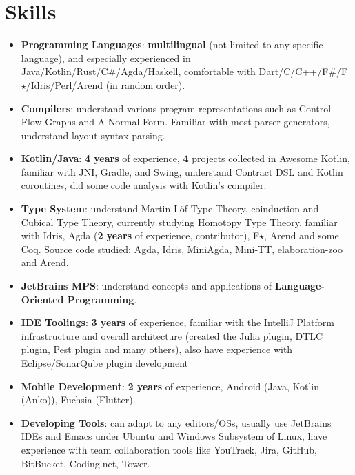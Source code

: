 \documentclass{resume}
\begin{document}
\section{Skills}
\begin{itemize}
  \item \textbf{Programming Languages}:
    \textbf{multilingual} (not limited to any specific language),
    and especially experienced in Java/Kotlin/Rust/C\#/Agda/Haskell,
    comfortable with Dart/C/C++/F\#/F$\star$/Idris/Perl/Arend (in random order).

  \item \textbf{Compilers}:
    understand various program representations such as Control Flow Graphs
    and A-Normal Form.
    Familiar with most parser generators, understand layout syntax parsing.

  \item \textbf{Kotlin/Java}:
    \textbf{4 years} of experience,
    \textbf{4} projects collected in
    \href{https://kotlin.link/?q=ice} {Awesome Kotlin},
    familiar with JNI, Gradle, and Swing,
    understand Contract DSL and Kotlin coroutines,
    did some code analysis with Kotlin's compiler.

  \item \textbf{Type System}:
    understand Martin-L\"{o}f Type Theory, coinduction and Cubical Type Theory,
    currently studying Homotopy Type Theory,
    familiar with Idris, Agda (\textbf{2 years} of experience, contributor),
    F$\star$, Arend and some Coq.
    \subitem Source code studied: Agda, Idris, MiniAgda, Mini-TT, elaboration-zoo and Arend.

  \item \textbf{JetBrains MPS}:
    understand concepts and applications of \textbf{Language-Oriented Programming}.

  \item \textbf{IDE Toolings}:
    \textbf{3 years} of experience,
    familiar with the IntelliJ Platform infrastructure and overall
    architecture (created the
    \href{https://plugins.jetbrains.com/plugin/10413}
         {Julia plugin},
    \href{https://plugins.jetbrains.com/plugin/12176}
         {DTLC plugin},
    \href{https://plugins.jetbrains.com/plugin/12046}
         {Pest plugin} and many others), also have experience with Eclipse/SonarQube
    plugin development

  \item \textbf{Mobile Development}:
    \textbf{2 years} of experience,
    Android (Java, Kotlin (Anko)), Fuchsia (Flutter).

  \item \textbf{Developing Tools}:
    can adapt to any editors/OSs, usually use JetBrains IDEs and Emacs under Ubuntu
    and Windows Subsystem of Linux,
    have experience with team collaboration tools like YouTrack,
    Jira, GitHub, BitBucket, Coding.net, Tower.
\end{itemize}
\end{document}
